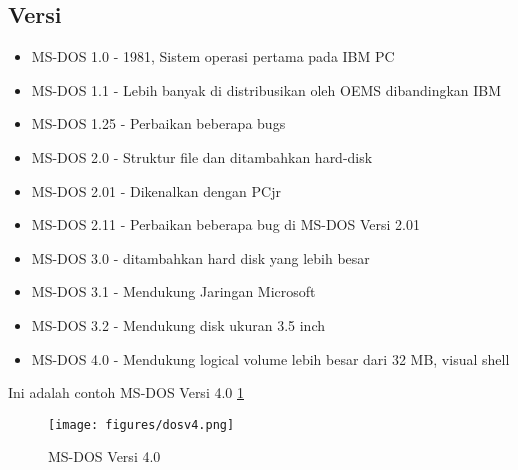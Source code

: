 		\subsection{Versi}
		\begin{itemize}
			\item MS-DOS 1.0 - 1981, Sistem operasi pertama pada IBM PC
			\item MS-DOS 1.1 - Lebih banyak di distribusikan oleh OEMS dibandingkan IBM
			\item MS-DOS 1.25 - Perbaikan beberapa bugs
			\item MS-DOS 2.0 - Struktur file dan ditambahkan hard-disk
			\item MS-DOS 2.01 - Dikenalkan dengan PCjr
			\item MS-DOS 2.11 - Perbaikan beberapa bug di MS-DOS Versi 2.01
			\item MS-DOS 3.0 - ditambahkan hard disk yang lebih besar
			\item MS-DOS 3.1 - Mendukung Jaringan Microsoft
			\item MS-DOS 3.2 - Mendukung disk ukuran 3.5 inch
			\item MS-DOS 4.0 - Mendukung logical volume lebih besar dari 32 MB, visual shell
		\end {itemize}
		
		\vspace{1cm} Ini adalah contoh MS-DOS Versi 4.0 \ref{dosv4}
		\begin{figure}[ht]
			\centerline{\texttt{[image: figures/dosv4.png]}}
			\caption{MS-DOS Versi 4.0}
			\label{dosv4}
			\end{figure}
		
